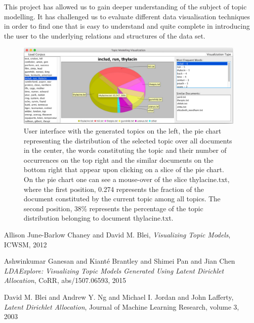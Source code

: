 \documentclass[11pt]{article}
\begin{document}
This project has allowed us to gain deeper understanding of the subject of topic modelling. It has challenged us to evaluate different data visualisation techniques in order to find one that is easy to understand and quite complete in introducing the user to the underlying relations and structures of the data set.

\begin{figure}
	\centering
	\includegraphics[scale=0.3]{index.jpg}
	\caption{User interface with the generated topics on the left, the pie chart representing the distribution of the selected topic over all documents in the center, the words constituting the topic and their number of occurrences on the top right and the similar documents on the bottom right that appear upon clicking on a slice of the pie chart. On the pie chart one can see a mouse-over of the slice thylacine.txt, where the first position, 0.274 represents the fraction of the document constituted by the current topic among all topics. The second position, 38\% represents the percentage of the topic distribution belonging to document thylacine.txt.}
	\label{picture1}
\end{figure}

\begin{thebibliography}{9}
  
  Allison June-Barlow Chaney and David M. Blei,
  \textit{Visualizing Topic Models},
  ICWSM,
  2012
  
    
  Ashwinkumar Ganesan and Kiant{\'e} Brantley and Shimei Pan and Jian Chen
  \textit{LDAExplore: Visualizing Topic Models Generated Using Latent Dirichlet Allocation},
  CoRR,
  abs/1507.06593,
  2015

  
    David M. Blei and Andrew Y. Ng and Michael I. Jordan and John Lafferty,
    \textit{Latent Dirichlet Allocation},
    Journal of Machine Learning Research, volume 3,
    2003

\end{thebibliography}
 
\end{document}
